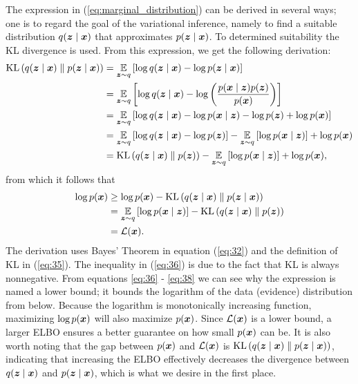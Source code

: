 The expression in (\ref{eq:marginal_distribution}) can be derived in several ways; one is to regard the goal of the variational inference, namely to find a suitable distribution $\q$ that approximates $\pzx$. To determined suitability the KL divergence is used. From this expression, we get the following derivation:
\begin{align}
    \kl{\q}{\pzx} &= \expectedvalue_{\ve{z}\sim q}\brts{\log \q - \log \pzx}\\
    &= \expectedvalue_{\ve{z}\sim q}\brts{\log \q - \log \prts{\frac{\pxz \pz}{\px}}}\label{eq:32}\\
    &= \expectedvalue_{\ve{z}\sim q}\brts{\log \q - \log \pxz - \log \pz + \log \px}\\
    &= \expectedvalue_{\ve{z}\sim q}\brts{\log \q - \log \pz}  - \expectedvalue_{\ve{z}\sim q}\brts{\log \pxz} + \log \px\\
    &= \kl{\q}{\pz}  - \expectedvalue_{\ve{z}\sim q}\brts{\log \pxz} + \log \px\label{eq:35},
\end{align}
from which it follows that
\begin{align}
    \log \px &\ge \log \px - \kl{\q}{\pzx}\label{eq:36}\\
             &= \expectedvalue_{\ve{z}\sim q}\brts{\log \pxz} - \kl{\q}{\pz}\\
             &= \mathcal{L}(\ve{x})\label{eq:38}.
\end{align}
The derivation uses Bayes' Theorem in equation (\ref{eq:32}) and the definition of KL in (\ref{eq:35}). The inequality in (\ref{eq:36}) is due to the fact that KL is always nonnegative. From equations \ref{eq:36} - \ref{eq:38} we can see why the expression is named a lower bound; it bounds the logarithm of the data (evidence) distribution from below. Because the logarithm is monotonically increasing function, maximizing $\log \px$ will also maximize $\px$. Since $\mathcal{L}(\ve{x})$ is a lower bound, a larger ELBO ensures a better guarantee on how small $\px$ can be. It is also worth noting that the gap between $\px$ and $\mathcal{L}(\ve{x})$ is $\kl{\q}{\pzx}$, indicating that increasing the ELBO effectively decreases the divergence between $\q$ and $\pzx$, which is what we desire in the first place.

